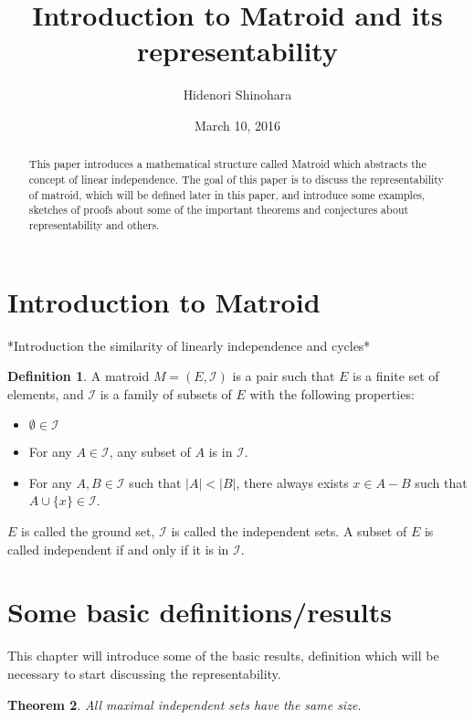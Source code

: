 \documentclass[psamsfonts]{amsart}
\title{Introduction to Matroid and its representability}
\author{Hidenori Shinohara}
\date{March 10, 2016}
\newtheorem{thm}{Theorem}[section]
\theoremstyle{definition}
\newtheorem{defn}[thm]{Definition}
\theoremstyle{remark}
\numberwithin{equation}{section}
\begin{document}
\begin{abstract}
This paper introduces a mathematical structure called Matroid which abstracts the concept of linear independence.
The goal of this paper is to discuss the representability of matroid, which will be defined later in this paper, and introduce some examples, sketches of proofs about some of the important theorems and conjectures about representability and others.

\end{abstract}

\maketitle

\tableofcontents

\section{Introduction to Matroid}

*Introduction the similarity of linearly independence and cycles*


\begin{defn}
A matroid $M = (E, \mathcal{I})$ is a pair such that $E$ is a finite set of elements, and $\mathcal{I}$ is a family of subsets of $E$ with the following properties:
\begin{itemize}
\item $\emptyset \in \mathcal{I}$
\item For any $A\in \mathcal{I}$, any subset of $A$ is in $\mathcal{I}$.
\item For any $A, B \in \mathcal{I}$ such that $\lvert A \rvert < \lvert B \rvert$, there always exists $x \in A - B$ such that $A \cup \{ x \} \in \mathcal{I}$.
\end{itemize}
$E$ is called the ground set, $\mathcal{I}$ is called the independent sets. A subset of $E$ is called independent if and only if it is in $\mathcal{I}$.
\end{defn}


\section{Some basic definitions/results}

This chapter will introduce some of the basic results, definition which will be necessary to start discussing the representability.

\begin{thm}
All maximal independent sets have the same size.
\end{thm}
\end{document}
